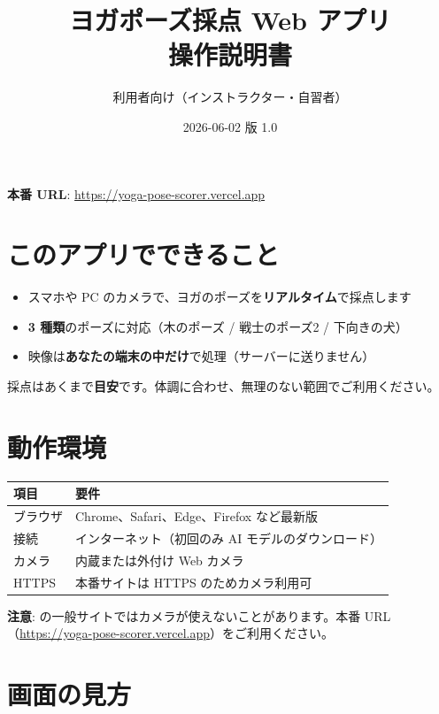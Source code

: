 \documentclass[a4paper,11pt]{ltjsarticle}
\title{ヨガポーズ採点 Web アプリ\\操作説明書}
\author{利用者向け（インストラクター・自習者）}
\date{2026-06-02 \quad 版 1.0}
\begin{document}
\maketitle
\thispagestyle{fancy}

\noindent
\textbf{本番 URL}: \url{https://yoga-pose-scorer.vercel.app}

\tableofcontents
\newpage

\section{このアプリでできること}

\begin{itemize}
  \item スマホや PC のカメラで、ヨガのポーズを\textbf{リアルタイム}で採点します
  \item \textbf{3 種類}のポーズに対応（木のポーズ / 戦士のポーズ2 / 下向きの犬）
  \item 映像は\textbf{あなたの端末の中だけ}で処理（サーバーに送りません）
\end{itemize}

採点はあくまで\textbf{目安}です。体調に合わせ、無理のない範囲でご利用ください。

\section{動作環境}

\begin{table}[h]
  \centering
  \begin{tabular}{@{}ll@{}}
    \toprule
    項目 & 要件 \\
    \midrule
    ブラウザ & Chrome、Safari、Edge、Firefox など最新版 \\
    接続 & インターネット（初回のみ AI モデルのダウンロード） \\
    カメラ & 内蔵または外付け Web カメラ \\
    HTTPS & 本番サイトは HTTPS のためカメラ利用可 \\
    \bottomrule
  \end{tabular}
\end{table}

\noindent\textbf{注意}:  の一般サイトではカメラが使えないことがあります。本番 URL（\url{https://yoga-pose-scorer.vercel.app}）をご利用ください。

\section{画面の見方}
\end{document}
